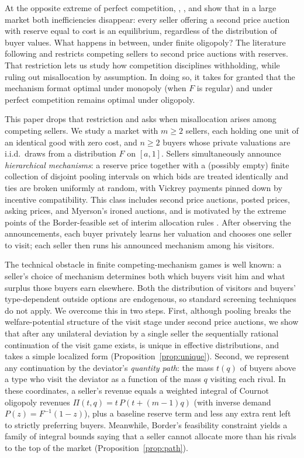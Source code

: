 \documentclass[12pt]{article}
\newcommand{\citeasnoun}[1]{\citet{#1}}
\theoremstyle{mystyle}
\theoremstyle{mystyle2}
\newcommand{\1}{\mathbf{1}}
\begin{document}
At the opposite extreme of perfect competition, \citeasnoun{mcafee}, \citeasnoun{peters1997}, and \citeasnoun{peters} show that in a large market both inefficiencies disappear: every seller offering a second price auction with reserve equal to cost is an equilibrium, regardless of the distribution of buyer values. What happens in between, under finite oligopoly? The literature following \citeasnoun{burguet} and \citeasnoun{virag2010competing} restricts competing sellers to second price auctions with reserves. That restriction lets us study how competition disciplines withholding, while ruling out misallocation by assumption. In doing so, it takes for granted that the mechanism format optimal under monopoly (when $F$ is regular) and under perfect competition remains optimal under oligopoly.

This paper drops that restriction and asks when misallocation arises among competing sellers. We study a market with $m\ge 2$ sellers, each holding one unit of an identical good with zero cost, and $n\ge 2$ buyers whose private valuations are i.i.d.\ draws from a distribution $F$ on $[a,1]$. Sellers simultaneously announce \emph{hierarchical mechanisms}: a reserve price together with a (possibly empty) finite collection of disjoint pooling intervals on which bids are treated identically and ties are broken uniformly at random, with Vickrey payments pinned down by incentive compatibility. This class includes second price auctions, posted prices, asking prices, and Myerson's ironed auctions, and is motivated by the extreme points of the Border-feasible set of interim allocation rules \citep{border1,kleiner2021}. After observing the announcements, each buyer privately learns her valuation and chooses one seller to visit; each seller then runs his announced mechanism among his visitors.

The technical obstacle in finite competing-mechanism games is well known: a seller's choice of mechanism determines both which buyers visit him and what surplus those buyers earn elsewhere. Both the distribution of visitors and buyers' type-dependent outside options are endogenous, so standard screening techniques \citep{jullien,rochet} do not apply. We overcome this in two steps. First, although pooling breaks the welfare-potential structure of the visit stage under second price auctions, we show that after any unilateral deviation by a single seller the sequentially rational continuation of the visit game exists, is unique in effective distributions, and takes a simple localized form (Proposition~\ref{prop:unique}). Second, we represent any continuation by the deviator's \emph{quantity path}: the mass $t(q)$ of buyers above a type who visit the deviator as a function of the mass $q$ visiting each rival. In these coordinates, a seller's revenue equals a weighted integral of Cournot oligopoly revenues $\Pi(t,q)=t\,P(t+(m-1)q)$ (with inverse demand $P(z)=F^{-1}(1-z)$), plus a baseline reserve term and less any extra rent left to strictly preferring buyers. Meanwhile, Border's feasibility constraint \citep{border1} yields a family of integral bounds saying that a seller cannot allocate more than his rivals to the top of the market (Proposition~\ref{prop:path}).
\end{document}
